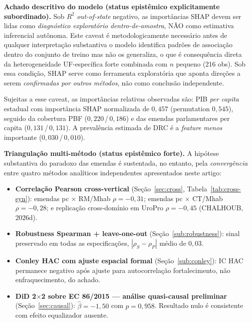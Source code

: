 \documentclass[12pt,a4paper,oneside]{article}
\begin{document}
\textbf{Achado descritivo do modelo (status epistêmico
explicitamente subordinado).} Sob $R^2$ \textit{out-of-state}
negativo, as importâncias SHAP devem ser lidas como
\textit{diagnóstico exploratório dentro-de-amostra}, NÃO como
estimativa inferencial autônoma. Este caveat é metodologicamente
necessário antes de qualquer interpretação substantiva
\textemdash{} o modelo identifica padrões de associação dentro do
conjunto de treino mas não os generaliza, o que é consequência
direta da heterogeneidade UF-específica forte combinada com
$n$ pequeno (216 obs). Sob essa condição, SHAP serve como
ferramenta exploratória que aponta direções a serem
\textit{confirmadas por outros métodos}, não como conclusão
independente.

Sujeitas a esse caveat, as importâncias relativas observadas são:
PIB \textit{per capita} estadual com importância SHAP normalizada
de $0{,}457$ (permutation $0{,}545$), seguido da cobertura PBF
($0{,}220$\,/\,$0{,}186$) e das emendas parlamentares per capita
($0{,}131$\,/\,$0{,}131$). A prevalência estimada de DRC é a
\textit{feature} \textit{menos} importante ($0{,}030$\,/\,$0{,}010$).

\textbf{Triangulação multi-método (status epistêmico forte).} A
hipótese substantiva do paradoxo das emendas é sustentada,
no entanto, pela \textit{convergência} entre quatro métodos
analíticos independentes apresentados neste artigo:

\begin{itemize}
\item \textbf{Correlação Pearson cross-vertical}
(Seção~\ref{sec:cross}, Tabela~\ref{tab:cross-syn}): emendas pc
$\times$ RM/Mhab $\rho = -0{,}31$; emendas pc $\times$ CT/Mhab
$\rho = -0{,}28$; e replicação cross-domínio em UroPro
$\rho = -0{,}45$ (CHALHOUB, 2026d).
\item \textbf{Robustness Spearman + leave-one-out}
(Seção~\ref{sub:robustness}): sinal preservado em todas as
especificações, $|\rho_S - \rho_P|$ médio de $0{,}03$.
\item \textbf{Conley HAC com ajuste espacial formal}
(Seção~\ref{sub:conley}): IC HAC permanece negativo após
ajuste para autocorrelação \textemdash{} fortalecimento, não
enfraquecimento, do achado.
\item \textbf{DiD 2$\times$2 sobre EC 86/2015 — análise
quasi-causal preliminar} (Seção~\ref{sec:causal}):
$\hat{\beta} = -1{,}50$ com $p = 0{,}958$. Resultado nulo é
consistente com efeito equalizador ausente.
\end{itemize}
\end{document}

